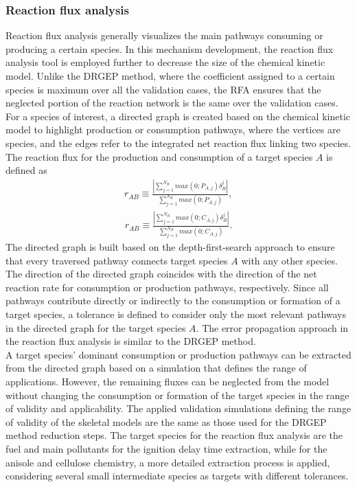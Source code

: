 \begin{refsection}
\subsubsection{Reaction flux analysis}
Reaction flux analysis generally visualizes the main pathways consuming or producing a certain species. In this mechanism development, the reaction flux analysis tool is employed further to decrease the size of the chemical kinetic model. Unlike the DRGEP method, where the coefficient assigned to a certain species is maximum over all the validation cases, the RFA ensures that the neglected portion of the reaction network is the same over the validation cases.
\\
For a species of interest, a directed graph is created based on the chemical kinetic model to highlight production or consumption pathways, where the vertices are species, and the edges refer to the integrated net reaction flux linking two species. The reaction flux for the production and consumption of a target species $A$ is defined as
\begin{align}
r_{AB} \equiv \frac{|\sum_{j=1}^{N_R} max(0; P_{A,j})\delta_{B}^{j}|}{\sum_{j=1}^{N_R} max(0; P_{A,j})},
\end{align}
\begin{align}
r_{AB} \equiv \frac{|\sum_{j=1}^{N_R} max(0; C_{A,j})\delta_{B}^{j}|}{\sum_{j=1}^{N_R} max(0; C_{A,j})}.
\end{align}
The directed graph is built based on the depth-first-search approach to ensure that every traversed pathway connects target species $A$ with any other species. The direction of the directed graph coincides with the direction of the net reaction rate for consumption or production pathways, respectively. Since all pathways contribute directly or indirectly to the consumption or formation of a target species, a tolerance is defined to consider only the most relevant pathways in the directed graph for the target species $A$. The error propagation approach in the reaction flux analysis is similar to the DRGEP method.
\\
A target species' dominant consumption or production pathways can be extracted from the directed graph based on a simulation that defines the range of applications. However, the remaining fluxes can be neglected from the model without changing the consumption or formation of the target species in the range of validity and applicability. The applied validation simulations defining the range of validity of the skeletal models are the same as those used for the DRGEP method reduction steps. The target species for the reaction flux analysis are the fuel and main pollutants for the ignition delay time extraction, while for the anisole and cellulose chemistry, a more detailed extraction process is applied, considering several small intermediate species as targets with different tolerances.



\end{refsection}
